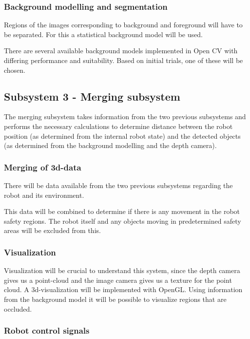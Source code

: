 \documentclass[10pt,a4paper,english]{article}
\begin{document}
\subsubsection{Background modelling and segmentation}

Regions of the images corresponding to background and foreground will have to be separated. For this a statistical background model will be used.

There are several available background models implemented in Open CV with differing performance and suitability. Based on initial trials, one of these will be chosen.

\subsection{Subsystem 3 - Merging subsystem}

The merging subsystem takes information from the two previous subsystems and performs the necessary calculations to determine distance between the robot position (as determined from the internal robot state) and the detected objects (as determined from the background modelling and the depth camera).

\subsubsection{Merging of 3d-data}

There will be data available from the two previous subsystems regarding the robot and its environment. 

This data will be combined to determine if there is any movement in the robot safety regions. The robot itself and any objects moving in predetermined safety areas will be excluded from this.

\subsubsection{Visualization}

Visualization will be crucial to understand this system, since the depth camera gives us a point-cloud and the image camera gives us a texture for the point cloud. A 3d-visualization will be implemented with OpenGL. Using information from the background model it will be possible to visualize regions that are occluded.

\subsubsection{Robot control signals}
\end{document}

